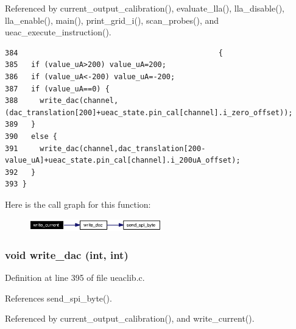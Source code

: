 Referenced by current\_\-output\_\-calibration(), evaluate\_\-lla(), lla\_\-disable(), lla\_\-enable(), main(), print\_\-grid\_\-i(), scan\_\-probes(), and ueac\_\-execute\_\-instruction().

\footnotesize\begin{verbatim}384                                              {
385   if (value_uA>200) value_uA=200;
386   if (value_uA<-200) value_uA=-200;
387   if (value_uA==0) {
388     write_dac(channel,(dac_translation[200]+ueac_state.pin_cal[channel].i_zero_offset));
389   }
390   else {
391     write_dac(channel,dac_translation[200-value_uA]+ueac_state.pin_cal[channel].i_200uA_offset);
392   }
393 }
\end{verbatim}\normalsize 




Here is the call graph for this function:\begin{figure}[H]
\begin{center}
\leavevmode
\includegraphics[width=163pt]{ueaclib_8h_a13_cgraph}
\end{center}
\end{figure}
\subsubsection{\setlength{\rightskip}{0pt plus 5cm}void write\_\-dac (int, int)}\label{ueaclib_8h_a12}




Definition at line 395 of file ueaclib.c.

References send\_\-spi\_\-byte().

Referenced by current\_\-output\_\-calibration(), and write\_\-current().

